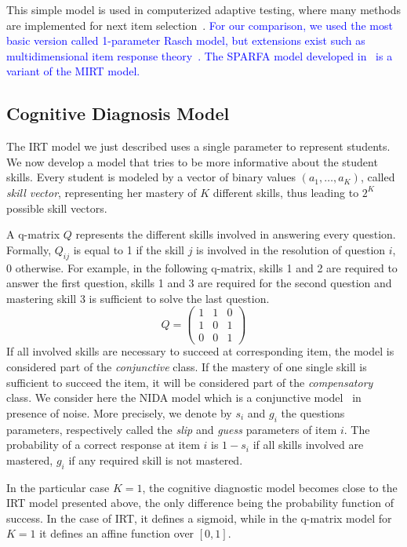\documentclass{sig-alternate}
\newcommand\note[1]{\textcolor{blue}{#1}}
\begin{document}
This simple model is used in computerized adaptive testing, where many methods are implemented for next item selection~\citep{MagisRaiche2012}. \note{For our comparison, we used the most basic version called 1-parameter Rasch model, but extensions exist such as multidimensional item response theory~\citep{Desmarais2012}. The SPARFA model developed in~\citep{Vats2013} is a variant of the MIRT model.}

\subsection{Cognitive Diagnosis Model}

The IRT model we just described uses a single parameter to represent students. We now develop a model that tries to be more informative about the student skills. Every student is modeled by a vector of binary values $(a_1, \ldots, a_K)$, called \emph{skill vector}, representing her mastery of $K$ different skills, thus leading to $2^K$ possible skill vectors. 

A q-matrix $Q$ \citep{Tatsuoka1983} represents the different skills involved in answering every question. Formally, $Q_{ij}$ is equal to 1 if the skill $j$ is involved in the resolution of question $i$, 0 otherwise. For example, in the following q-matrix, skills 1 and 2 are required to answer the first question, skills 1 and 3 are required for the second question and mastering skill 3 is sufficient to solve the last question.
\[ Q = \left(\begin{array}{lll}
1 & 1 & 0\\
1 & 0 & 1\\
0 & 0 & 1
\end{array}\right) \]
If all involved skills are necessary to succeed at corresponding item, the model is considered part of the \emph{conjunctive} class. 
If the mastery of one single skill is sufficient to succeed the item, it will be considered part of the \emph{compensatory} class. We consider here the NIDA model which is a conjunctive model~\citep{Desmarais2012} in presence of noise. More precisely, we denote by $s_i$ and $g_i$ the questions parameters, respectively called the \emph{slip} and \emph{guess} parameters of item $i$. The probability of a correct response at item $i$ is $1 - s_i$ if all skills involved are mastered, $g_i$ if any required skill is not mastered.

In the particular case $K=1$, the cognitive diagnostic model becomes close to the IRT model presented above, the only difference being the probability function of success. In the case of IRT, it defines a sigmoid, while in the q-matrix model for $K = 1$ it defines an affine function over $[0,1]$.
\end{document}
